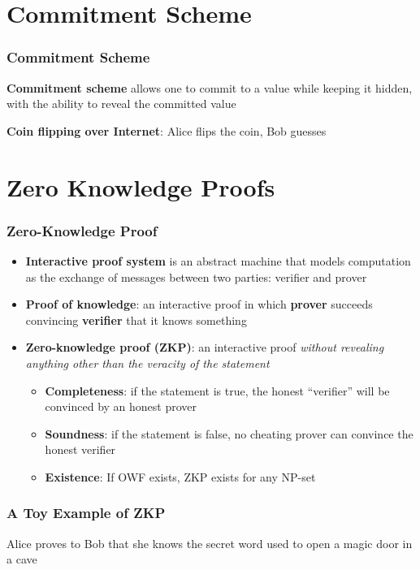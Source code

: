 \section{Commitment Scheme}
\begin{frame}\frametitle{Commitment Scheme}
\textbf{Commitment scheme} allows one to commit to a value while keeping it hidden, with the ability to reveal the committed value
\newline

\textbf{Coin flipping over Internet}: Alice flips the coin, Bob guesses
\begin{figure}
\begin{center}

\end{center}
\end{figure}
\end{frame}
\section{Zero Knowledge Proofs}
\begin{frame}\frametitle{Zero-Knowledge Proof}
\begin{itemize}
\item \textbf{Interactive proof system} is an abstract machine that models computation as the exchange of messages between two parties: verifier and prover
\item \textbf{Proof of knowledge}: an interactive proof in which \textbf{prover} succeeds convincing \textbf{verifier} that it knows something
\item \textbf{Zero-knowledge proof (ZKP)}: an interactive proof \emph{without revealing anything other than the veracity of the statement}
\begin{itemize}
\item \textbf{Completeness}: if the statement is true, the honest ``verifier'' will be convinced by an honest prover
\item \textbf{Soundness}: if the statement is false, no cheating prover can convince the honest verifier
\item \textbf{Existence}: If OWF exists, ZKP exists for any NP-set
\end{itemize}
\end{itemize}
\end{frame}
\begin{frame}\frametitle{A Toy Example of ZKP}
Alice {\color{red} \LARGE \Ladiesroom} proves to Bob {\color{blue} \LARGE \Gentsroom} that she knows the secret word used to open a magic door in a cave
\begin{figure}
\begin{center}

\end{center}
\end{figure}
\end{frame}
